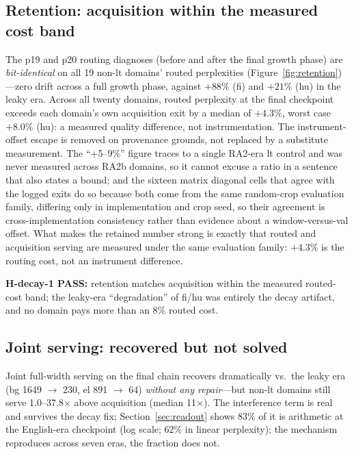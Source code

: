 \documentclass[11pt]{article}
\theoremstyle{definition}\newtheorem{definition}{Definition}
\theoremstyle{remark}\newtheorem{remark}{Remark}
\begin{document}
\subsection{Retention: acquisition within the measured cost band}

The p19 and p20 routing diagnoses (before and after the final growth phase) are
\emph{bit-identical} on all 19 non-lt domains' routed perplexities (Figure~\ref{fig:retention})---zero drift across a
full growth phase, against $+88\%$ (fi) and $+21\%$ (hu) in the leaky era. Across all
twenty domains, routed perplexity at the final checkpoint exceeds each domain's own
acquisition exit by a median of $+4.3\%$, worst case $+8.0\%$ (hu): a measured quality
difference, not instrumentation. The instrument-offset escape is removed on provenance
grounds, not replaced by a substitute measurement. The ``+5--9\%'' figure traces to a
single RA2-era lt control and was never measured across RA2b domains, so it cannot excuse
a ratio in a sentence that also states a bound; and the sixteen matrix diagonal cells that
agree with the logged exits do so because both come from the same random-crop evaluation
family, differing only in implementation and crop seed, so their agreement is
cross-implementation consistency rather than evidence about a window-versus-val offset.
What makes the retained number strong is exactly that routed and acquisition serving are
measured under the same evaluation family: $+4.3\%$ is the routing cost, not an instrument
difference.

\textbf{H-decay-1 PASS:} retention matches acquisition within the measured routed-cost
band; the leaky-era ``degradation'' of fi/hu was entirely the decay artifact, and no
domain pays more than an $8\%$ routed cost.

\subsection{Joint serving: recovered but not solved}

Joint full-width serving on the final chain recovers dramatically vs.\ the leaky era
(bg 1649 $\to$ 230, el 891 $\to$ 64) \emph{without any repair}---but non-lt domains still
serve 1.0--37.8$\times$ above acquisition (median 11$\times$). The interference term is real and survives the
decay fix; Section~\ref{sec:readout} shows 83\% of it is arithmetic at the English-era checkpoint (log scale; 62\% in linear perplexity); the mechanism reproduces across seven eras, the fraction does not.
\end{document}
